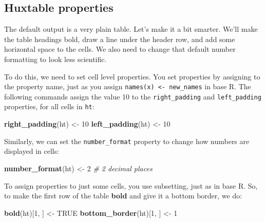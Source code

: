 \documentclass[]{article}
\newenvironment{Shaded}{\begin{snugshade}}{\end{snugshade}}
\newcommand{\KeywordTok}[1]{\textcolor[rgb]{0.13,0.29,0.53}{\textbf{#1}}}
\newcommand{\DecValTok}[1]{\textcolor[rgb]{0.00,0.00,0.81}{#1}}
\newcommand{\StringTok}[1]{\textcolor[rgb]{0.31,0.60,0.02}{#1}}
\newcommand{\CommentTok}[1]{\textcolor[rgb]{0.56,0.35,0.01}{\textit{#1}}}
\newcommand{\OtherTok}[1]{\textcolor[rgb]{0.56,0.35,0.01}{#1}}
\newcommand{\NormalTok}[1]{#1}
\begin{document}
\subsection{Huxtable properties}\label{huxtable-properties}

The default output is a very plain table. Let's make it a bit smarter.
We'll make the table headings bold, draw a line under the header row,
and add some horizontal space to the cells. We also need to change that
default number formatting to look less scientific.

To do this, we need to set cell level properties. You set properties by
assigning to the property name, just as you assign
\texttt{names(x)\ \textless{}-\ new\_names} in base R. The following
commands assign the value 10 to the \texttt{right\_padding} and
\texttt{left\_padding} properties, for all cells in \texttt{ht}:

\begin{Shaded}
\begin{Highlighting}[]
\KeywordTok{right_padding}\NormalTok{(ht) <-}\StringTok{ }\DecValTok{10}
\KeywordTok{left_padding}\NormalTok{(ht)  <-}\StringTok{ }\DecValTok{10}
\end{Highlighting}
\end{Shaded}

\FloatBarrier

Similarly, we can set the \texttt{number\_format} property to change how
numbers are displayed in cells:

\begin{Shaded}
\begin{Highlighting}[]
\KeywordTok{number_format}\NormalTok{(ht) <-}\StringTok{ }\DecValTok{2}    \CommentTok{# 2 decimal places}
\end{Highlighting}
\end{Shaded}

\FloatBarrier

To assign properties to just some cells, you use subsetting, just as in
base R. So, to make the first row of the table \textbf{bold} and give it
a bottom border, we do:

\begin{Shaded}
\begin{Highlighting}[]
\KeywordTok{bold}\NormalTok{(ht)[}\DecValTok{1}\NormalTok{, ]          <-}\StringTok{ }\OtherTok{TRUE}
\KeywordTok{bottom_border}\NormalTok{(ht)[}\DecValTok{1}\NormalTok{, ] <-}\StringTok{ }\DecValTok{1}
\end{Highlighting}
\end{Shaded}
\end{document}
